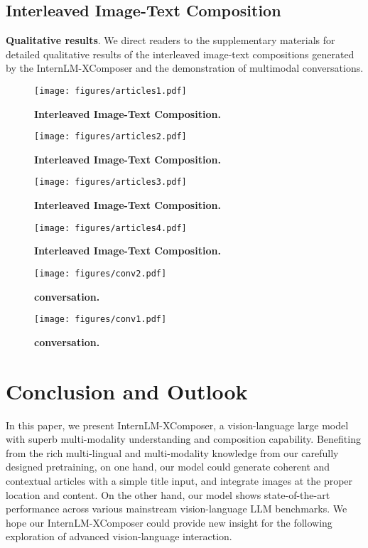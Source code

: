 \documentclass[10pt,twocolumn,letterpaper]{article}
\begin{document}
\subsection{Interleaved Image-Text Composition}



\noindent\textbf{Qualitative results}. We direct readers to the supplementary materials for detailed qualitative results of the interleaved image-text compositions generated by the InternLM-XComposer and the demonstration of multimodal conversations.


\begin{figure*}[t!]
	\centering
	\texttt{[image: figures/articles1.pdf]}
	\caption{\textbf{Interleaved Image-Text Composition.} }
	\label{fig:article1}
\end{figure*}

\begin{figure*}[t!]
	\centering
	\texttt{[image: figures/articles2.pdf]}
	\caption{\textbf{Interleaved Image-Text Composition.} }
	\label{fig:article2}
\end{figure*}

\begin{figure*}[t!]
	\centering
	\texttt{[image: figures/articles3.pdf]}
	\caption{\textbf{Interleaved Image-Text Composition.} }
	\label{fig:article2}
\end{figure*}

\begin{figure*}[t!]
	\centering
	\texttt{[image: figures/articles4.pdf]}
	\caption{\textbf{Interleaved Image-Text Composition.} }
	\label{fig:article2}
\end{figure*}

\begin{figure*}[t!]
	\centering
	\texttt{[image: figures/conv2.pdf]}
	\caption{\textbf{conversation.} }
	\label{fig:conv2}
\end{figure*}

\begin{figure*}[t!]
	\centering
	\texttt{[image: figures/conv1.pdf]}
	\caption{\textbf{conversation.} }
	\label{fig:conv1}
\end{figure*} \section{Conclusion and Outlook}
In this paper, we present InternLM-XComposer, a vision-language large model with superb multi-modality understanding and composition capability. Benefiting from the rich multi-lingual and multi-modality knowledge from our carefully designed pretraining, on one hand, our model could generate coherent and contextual articles with a simple title input, and integrate images at the proper location and content. On the other hand, our model shows state-of-the-art performance across various mainstream vision-language LLM benchmarks. We hope our InternLM-XComposer could provide new insight for the following exploration of advanced vision-language interaction. 




{\small


}
\end{document}
